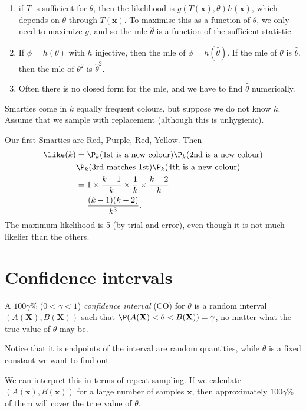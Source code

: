 \documentclass[a4paper]{article}
\begin{document}
\note
\begin{enumerate}
  \item if $T$ is sufficient for $\theta$, then the likelihood is $g(T(\mathbf{x}), \theta)h(\mathbf{x})$, which depends on $\theta$ through $T(\mathbf{x})$. To maximise this as a function of $\theta$, we only need to maximize $g$, and so the mle $\hat{\theta}$ is a function of the sufficient statistic.
  \item If $\phi = h(\theta)$ with $h$ injective, then the mle of $\phi =h(\hat{\theta})$. If the mle of $\theta$ is $\hat{\theta}$, then the mle of $\theta^2$ is $\hat{\theta}^2$.
  \item Often there is no closed form for the mle, and we have to find $\hat{\theta}$ numerically.
\end{enumerate}

\begin{eg}
  Smarties come in $k$ equally frequent colours, but suppose we do not know $k$. Assume that we sample with replacement (although this is unhygienic).

  Our first Smarties are Red, Purple, Red, Yellow. Then
  \begin{align*}
  \like(k)&=\P_k(\text{1st is a new colour})\P_k(\text{2nd is a new colour})\\\
  & \P_k(\text{3rd matches 1st})\P_k(\text{4th is a new colour})\\
  &= 1\times \frac{k - 1}{k}\times \frac{1}{k}\times \frac{k - 2}{k}\\
  &= \frac{(k - 1)(k - 2)}{k^3}.
\end{align*}
The maximum likelihood is 5 (by trial and error), even though it is not much likelier than the others.
\end{eg}

\section{Confidence intervals}
\begin{defi}
  A $100\gamma\%$ ($0 < \gamma < 1$) \emph{confidence interval} (CO) for $\theta$ is a random interval $(A(\mathbf{X}), B(\mathbf{X}))$ such that $\P(A(\mathbf{X}) < \theta < B(\mathbf{X})) = \gamma$, no matter what the true value of $\theta$ may be.
\end{defi}

Notice that it is endpoints of the interval are random quantities, while $\theta$ is a fixed constant we want to find out.

We can interpret this in terms of repeat sampling. If we calculate $(A(\mathbf{x}), B(\mathbf{x}))$ for a large number of samples $\mathbf{x}$, then approximately $100\gamma\%$ of them will cover the true value of $\theta$.
\end{document}

